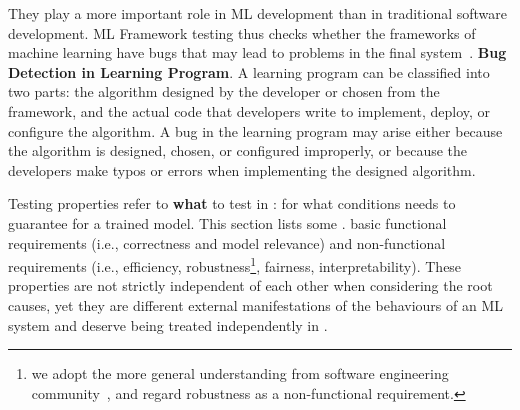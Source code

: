 They play a more important role in ML development than in traditional software development.
ML Framework testing thus checks whether the frameworks of machine learning have bugs that may lead to problems in the final system~.
\noindent \textbf{\textbf{Bug Detection in Learning Program}}. 
A learning program can be classified into two parts: the algorithm designed by the developer or chosen from the framework, and the actual code that developers write to implement, deploy, or configure the algorithm.
A bug in the learning program may arise either because the algorithm is designed, chosen, or configured improperly, or because the developers make typos or errors when implementing the designed algorithm.

\label{sec:mltestingproblems}
Testing properties refer to \textbf{what} to test in \mlt{}: for what conditions \mlt{} needs to guarantee for a trained model.
This section lists some .
 basic functional requirements (i.e., correctness and model relevance) and non-functional requirements (i.e., efficiency, robustness\footnote{we adopt the more general understanding from software engineering community~, and regard robustness as a non-functional requirement.}, fairness, interpretability).
These properties are not strictly independent of each other when considering the root causes, yet they are different external manifestations of the behaviours of an ML system and deserve being treated independently in \mlt{}.

